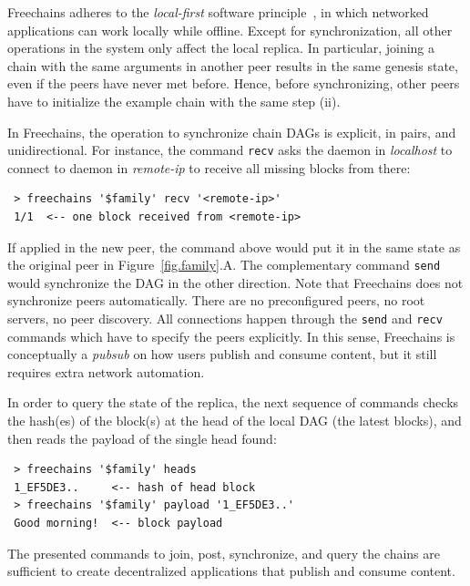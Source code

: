 \documentclass[10pt,journal,compsoc]{IEEEtran}
\newcommand{\FC}       {Freechains\xspace}
\newcommand{\code}[1]  {\texttt{\footnotesize{#1}}}
\begin{document}
\FC adheres to the \emph{local-first} software principle~\cite{p2p.local}, in
which networked applications can work locally while offline.
Except for synchronization, all other operations in the system only affect the
local replica.
In particular, joining a chain with the same arguments in another peer results
in the same genesis state, even if the peers have never met before.
Hence, before synchronizing, other peers have to initialize the example chain
with the same step (ii).

In \FC, the operation to synchronize chain DAGs is explicit, in pairs, and
unidirectional.
For instance, the command \code{recv} asks the daemon in \emph{localhost} to
connect to daemon in \emph{remote-ip} to receive all missing blocks from there:

{\footnotesize
\begin{verbatim}
 > freechains '$family' recv '<remote-ip>'
 1/1  <-- one block received from <remote-ip>
\end{verbatim}
}

If applied in the new peer, the command above would put it in the same state as
the original peer in Figure~\ref{fig.family}.A.
The complementary command \code{send} would synchronize the DAG in the other
direction.
Note that \FC does not synchronize peers automatically.
There are no preconfigured peers, no root servers, no peer discovery.
All connections happen through the \code{send} and \code{recv} commands which
have to specify the peers explicitly.
In this sense, \FC is conceptually a \emph{pubsub} on how users publish and
consume content, but it still requires extra network automation.

In order to query the state of the replica, the next sequence of commands
checks the hash(es) of the block(s) at the head of the local DAG (the latest
blocks), and then reads the payload of the single head found:


{\footnotesize
\begin{verbatim}
 > freechains '$family' heads
 1_EF5DE3..     <-- hash of head block
 > freechains '$family' payload '1_EF5DE3..'
 Good morning!  <-- block payload
\end{verbatim}
}

The presented commands to join, post, synchronize, and query the chains are
sufficient to create decentralized applications that publish and consume
content.
\end{document}

